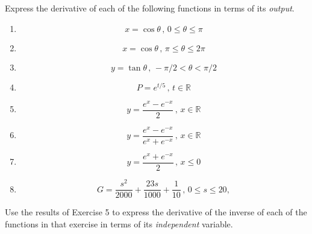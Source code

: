 \documentclass{ximera}
\begin{document}
\begin{exercise}  \label{Eggghhybvbxzzz}
Express the derivative of each of the following functions in terms of its \emph{output}.
\begin{enumerate}
\item 
\[
       x = \cos\theta \, , \, 0\leq \theta \leq \pi
\]


\item 
\[
       x = \cos\theta \, , \, \pi\leq \theta \leq 2\pi
\]

\item 
\[
       y = \tan\theta \, , \, -\pi/2 < \theta < \pi/2
\]

\item
\[
     P = e^{t/5} \, , \, t\in \mathbb{R} 
\]

\item 
\[
  y = \frac{e^x - e^{-x}}{2} \, , \, x\in \mathbb{R} 
\]

\item 
\[
  y = \frac{e^x - e^{-x}}{e^x + e^{-x}} \, , \, x\in \mathbb{R} 
\]

\item 
\[
  y = \frac{e^x+ e^{-x}}{2} \, , \, x \leq 0 
\]


\item
\[
   G = \frac{s^2}{2000} + \frac{23s}{1000} + \frac{1}{10} \, , \, 0\leq s\leq 20, 
\]

\end{enumerate}

\end{exercise}

\begin{exercise} \label{E898gbfgg}
Use the results of Exercise 5 to express the derivative of the inverse of each of the functions in that exercise in terms of its \emph{independent} variable.
\end{exercise}
\end{document}
